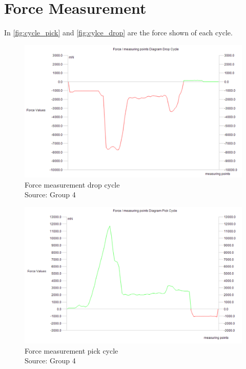 \documentclass[a4paper,12pt]{scrreprt}
\begin{document}
\section{Force Measurement}
In \autoref{fig:cycle_pick} and \autoref{fig:cylce_drop} are the force shown of each cycle.
\begin{figure}[H]
  \centering
   \includegraphics[width=1\textwidth]{pictures/cylce_drop}
   \caption[Force measurement drop cycle]{Force measurement drop cycle\\
	Source: Group 4  
   }
   \label{fig:cylce_drop}
\end{figure} 

\begin{figure}[H]
  \centering
   \includegraphics[width=1\textwidth]{pictures/cycle_pick}
   \caption[Force measurement pick cycle]{Force measurement pick cycle\\
	Source: Group 4  
   }
   \label{fig:cycle_pick}
\end{figure} 
\end{document}
